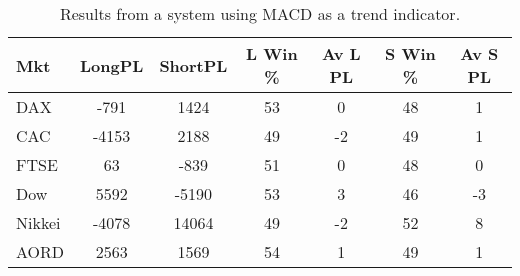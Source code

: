 \begin{table}[ht]
\centering
\caption[Results from a system using MACD as a trend indicator]{Results from a system using MACD as a trend indicator.} 
\label{tab:mac_trend_results}
\begin{tabular}{lcccccc}
  \toprule Mkt & LongPL & ShortPL & L Win \% & Av L PL & S Win \% & Av S PL \\ 
  \midrule DAX & -791 & 1424 & 53 & 0 & 48 & 1 \\ 
  CAC & -4153 & 2188 & 49 & -2 & 49 & 1 \\ 
  FTSE & 63 & -839 & 51 & 0 & 48 & 0 \\ 
  Dow & 5592 & -5190 & 53 & 3 & 46 & -3 \\ 
  Nikkei & -4078 & 14064 & 49 & -2 & 52 & 8 \\ 
  AORD & 2563 & 1569 & 54 & 1 & 49 & 1 \\ 
   \bottomrule \end{tabular}
\end{table}
